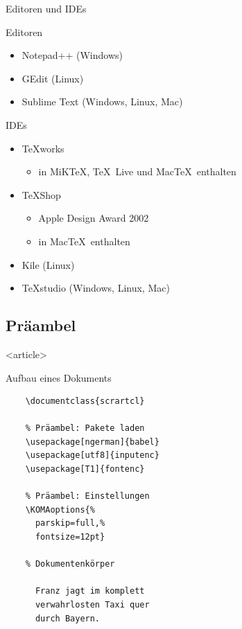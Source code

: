 \begin{Frame}{Editoren und IDEs}
  \begin{Block}{Editoren}
    \begin{itemize}
      \item Notepad++ (Windows)
      \item GEdit (Linux)
      \item Sublime Text (Windows, Linux, Mac)
    \end{itemize}
  \end{Block}

  \pause

  \begin{Block}{IDEs}
    \begin{itemize}
      \item \TeX works
        \begin{itemize}
          \item in MiK\TeX, \TeX\ Live und Mac\TeX\ enthalten
        \end{itemize}
      \item \TeX Shop
        \begin{itemize}
          \item Apple Design Award 2002
          \item in Mac\TeX\ enthalten
        \end{itemize}
      \item Kile (Linux)
      \item TeXstudio (Windows, Linux, Mac)
    \end{itemize}
  \end{Block}
\end{Frame}


\subsection{Präambel}

\mode
<article>

\begin{Frame}[fragile]{Aufbau eines Dokuments}
  \begin{lstlisting}[gobble=4]
    % Dokumentenklasse
    \documentclass{scrartcl}

    % Präambel: Pakete laden
    \usepackage[ngerman]{babel}
    \usepackage[utf8]{inputenc}
    \usepackage[T1]{fontenc}

    % Präambel: Einstellungen
    \KOMAoptions{%
      parskip=full,%
      fontsize=12pt}

    % Dokumentenkörper
    
      Franz jagt im komplett
      verwahrlosten Taxi quer
      durch Bayern.
    
  \end{lstlisting}
\end{Frame}

